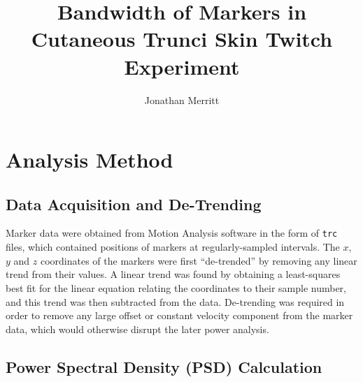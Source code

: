 \documentclass[
  a4paper,
  11pt,
  twoside,
  toc=flat,
  listof=flat
]{scrbook}
\begin{document}
\title{Bandwidth of Markers in Cutaneous Trunci Skin Twitch Experiment}
\author{Jonathan Merritt}
\begin{titlepage}
  \maketitle
\end{titlepage}

\tableofcontents
\listoftables
\listoffigures

\chapter{Analysis Method}

\section{Data Acquisition and De-Trending}

Marker data were obtained from Motion Analysis software in the form of \texttt{trc} files, which contained positions of markers at regularly-sampled intervals.  The $x$, $y$ and $z$ coordinates of the markers were first ``de-trended'' by removing any linear trend from their values.  A linear trend was found by obtaining a least-squares best fit for the linear equation relating the coordinates to their sample number, and this trend was then subtracted from the data.  De-trending was required in order to remove any large offset or constant velocity component from the marker data, which would otherwise disrupt the later power analysis.

\section{Power Spectral Density (PSD) Calculation}
\end{document}
